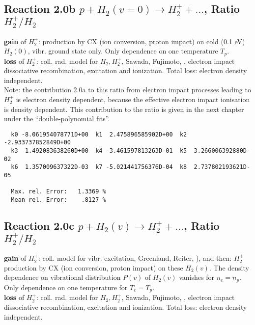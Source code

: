 \documentclass[12pt,dvipdfmx]{article}
\begin{document}
\subsection{
Reaction 2.0b     $ p + H_2(v=0) \rightarrow  H_2^+ + ... $, Ratio  \ $H_2^+/H_2$
}
\textbf{gain }of $H_2^+$:
production by CX (ion conversion, proton impact) on cold (0.1 eV) $H_2(0)$, vibr. ground state only.
Only dependence on one temperature  $T_p$.
\\
\textbf{loss }of $H_2^+$: coll. rad. model for $H_2, H_2^+$, Sawada, Fujimoto, \cite{kn:Sawada},
electron impact dissociative recombination, excitation and ionization. Total loss: electron density independent.\\

Note: the contribution 2.0a to this ratio from electron impact processes leading to $H_2^+$ is electron density dependent,
because the effective electron impact ionisation is density dependent.
This contribution to the ratio is given in the next chapter under the ``double-polynomial fits''.
\medskip


\begin{small}\begin{verbatim}
  k0 -8.061954078771D+00  k1  2.475896585902D+00  k2 -2.933737852849D+00
  k3  1.492083638260D+00  k4 -3.461597813263D-01  k5  3.266006392880D-02
  k6  1.357009637322D-03  k7 -5.021441756376D-04  k8  2.737802193621D-05

  Max. rel. Error:   1.3369 %
  Mean rel. Error:    .8127 %

\end{verbatim}\end{small}

\subsection{
Reaction 2.0c   $p + H_2(v) \rightarrow H_2^+ + ... $, Ratio  \ $H_2^+/H_2$
}
\textbf{gain }of $H_2^+$: coll. model for vibr. excitation, Greenland, Reiter, \cite{kn:Green}),
and then: $H_2^+$ production by CX (ion conversion, proton impact) on these $H_2(v)$.
The density dependence on vibrational distribution $P(v)$ of $H_2(v)$ vanishes for $n_e=n_p$.
Only dependence on one temperature for $T_e=T_p$.
\\
\textbf{loss }of $H_2^+$: coll. rad. model for $H_2, H_2^+$, Sawada, Fujimoto, \cite{kn:Sawada},
electron impact dissociative recombination, excitation and ionization. Total loss: electron density independent.\\
\end{document}
